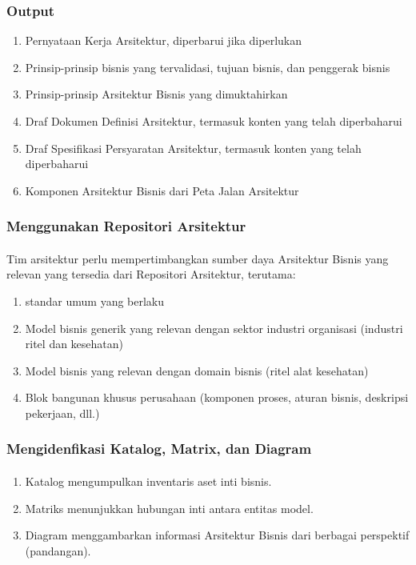 \documentclass[aspectratio=169, table]{beamer}
\begin{document}
	\begin{frame}
		\frametitle{Output}
		\begin{enumerate}
			\item Pernyataan Kerja Arsitektur, diperbarui jika diperlukan
			\item Prinsip-prinsip bisnis yang tervalidasi, tujuan bisnis, dan penggerak bisnis
			\item Prinsip-prinsip Arsitektur Bisnis yang dimuktahirkan
			\item Draf Dokumen Definisi Arsitektur, termasuk konten yang telah diperbaharui
			\item Draf Spesifikasi Persyaratan Arsitektur, termasuk konten yang telah diperbaharui
			\item Komponen Arsitektur Bisnis dari Peta Jalan Arsitektur
		\end{enumerate}
	\end{frame}

	\begin{frame}
		\frametitle{Menggunakan Repositori Arsitektur}
		\framesubtitle{\hspace{1cm}}
		Tim arsitektur perlu mempertimbangkan sumber daya Arsitektur Bisnis yang relevan yang tersedia dari Repositori Arsitektur, terutama:
		\begin{enumerate}
			\item standar umum yang berlaku
			\item Model bisnis generik yang relevan dengan sektor industri organisasi (industri ritel dan kesehatan)
			\item Model bisnis yang relevan dengan domain bisnis (ritel alat kesehatan)
			\item Blok bangunan khusus perusahaan (komponen proses, aturan bisnis, deskripsi pekerjaan, dll.)

		\end{enumerate}
	\end{frame}


	\begin{frame}
		\frametitle{Mengidenfikasi Katalog, Matrix, dan Diagram}
		\framesubtitle{\hspace{1cm}}
		\begin{enumerate}
			\item Katalog mengumpulkan inventaris aset inti bisnis.
			\item Matriks menunjukkan hubungan inti antara entitas model.
			\item Diagram menggambarkan informasi Arsitektur Bisnis dari berbagai perspektif (pandangan).
		\end{enumerate}
	\end{frame}
\end{document}
